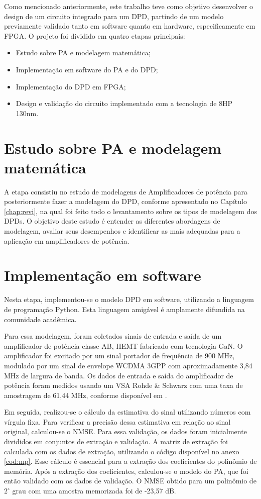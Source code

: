 Como mencionado anteriormente, este trabalho teve como objetivo desenvolver o design de um circuito integrado para um DPD, partindo de um modelo previamente validado tanto em software quanto em hardware, especificamente em FPGA. O projeto foi dividido em quatro etapas principais:

\begin{itemize}
\item Estudo sobre PA e modelagem matemática;
\item Implementação em software do PA e do DPD;
\item Implementação do DPD em FPGA;
\item Design e validação do circuito implementado com a tecnologia de 8HP 130nm.
\end{itemize}


\section{Estudo sobre PA e modelagem matemática}
A etapa consistiu no estudo de modelagens de Amplificadores de potência para posteriormente fazer a modelagem do DPD, conforme apresentado no Capítulo \ref{chap:revi}, na qual foi feito todo o levantamento sobre os tipos de modelagem dos DPDs. O objetivo deste estudo é entender as diferentes abordagens de modelagem, avaliar seus desempenhos e identificar as mais adequadas para a aplicação em amplificadores de potência.

\section{Implementação em software} \label{sec:implsoft}

Nesta etapa, implementou-se o modelo DPD em software, utilizando a linguagem de programação Python. Esta linguagem amigável é amplamente difundida na comunidade acadêmica.

Para essa modelagem, foram coletados sinais de entrada e saída de um amplificador de potência classe AB, HEMT fabricado com tecnologia GaN. O amplificador foi excitado por um sinal portador de frequência de 900 MHz, modulado por um sinal de envelope WCDMA 3GPP com aproximadamente 3,84 MHz de largura de banda. Os dados de entrada e saída do amplificador de potência foram medidos usando um VSA Rohde \& Schwarz com uma taxa de amostragem de 61,44 MHz, conforme disponível em \cite{Bonfim2016}.

Em seguida, realizou-se o cálculo da estimativa do sinal utilizando números com vírgula fixa. Para verificar a precisão dessa estimativa em relação ao sinal original, calculou-se o NMSE. Para essa validação, os dados foram inicialmente divididos em conjuntos de extração e validação. A matriz de extração foi calculada com os dados de extração, utilizando o código disponível no anexo \ref{cod:mp}. Esse cálculo é essencial para a extração dos coeficientes do polinômio de memória. Após a extração dos coeficientes, calculou-se o modelo do PA, que foi então validado com os dados de validação. O NMSE obtido para um polinômio de $2^\circ$ grau com uma amostra memorizada foi de -23,57 dB.

